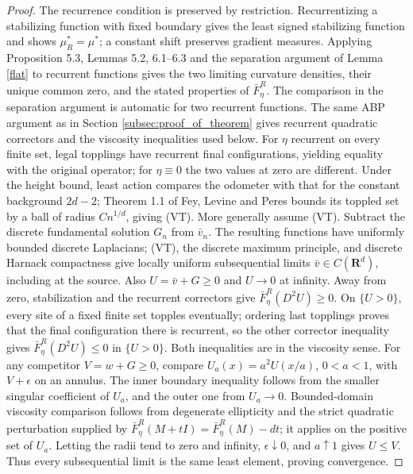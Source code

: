\documentclass[12pt]{amsart}
\newcommand{\R}{\mathbf{R}}
\begin{document}
\begin{proof} %
The recurrence condition is preserved by restriction. Recurrentizing a stabilizing function with fixed boundary gives the least signed stabilizing function and shows $\mu_R^*=\mu^*$; a constant shift preserves gradient measures. Applying Proposition 5.3, Lemmas 5.2, 6.1--6.3 and the separation argument of Lemma \ref{flat} to recurrent functions gives the two limiting curvature densities, their unique common zero, and the stated properties of $\bar F^R_\eta$. The comparison in the separation argument is automatic for two recurrent functions. The same ABP argument as in Section \ref{subsec:proof_of_theorem} gives recurrent quadratic correctors and the viscosity inequalities used below. For $\eta$ recurrent on every finite set, legal topplings have recurrent final configurations, yielding equality with the original operator; for $\eta\equiv0$ the two values at zero are different. %
Under the height bound, least action compares the odometer with that for the constant background $2d-2$; Theorem 1.1 of Fey, Levine and Peres \cite{fey2010growth} bounds its toppled set by a ball of radius $Cn^{1/d}$, giving (VT). More generally assume (VT). Subtract the discrete fundamental solution $G_n$ from $\bar v_n$. The resulting functions have uniformly bounded discrete Laplacians; (VT), the discrete maximum principle, and discrete Harnack compactness give locally uniform subsequential limits $\bar v\in C(\R^d)$, including at the source. Also $U=\bar v+G\geq0$ and $U\to0$ at infinity. %
Away from zero, stabilization and the recurrent correctors give $\bar F^R_\eta(D^2U)\geq0$. On $\{U>0\}$, every site of a fixed finite set topples eventually; ordering last topplings proves that the final configuration there is recurrent, so the other corrector inequality gives $\bar F^R_\eta(D^2U)\leq0$ in $\{U>0\}$. Both inequalities are in the viscosity sense. %
For any competitor $V=w+G\geq0$, compare $U_a(x)=a^2U(x/a)$, $0<a<1$, with $V+\epsilon$ on an annulus. The inner boundary inequality follows from the smaller singular coefficient of $U_a$, and the outer one from $U_a\to0$. Bounded-domain viscosity comparison follows from degenerate ellipticity and the strict quadratic perturbation supplied by $\bar F^R_\eta(M+tI)=\bar F^R_\eta(M)-dt$; it applies on the positive set of $U_a$. Letting the radii tend to zero and infinity, $\epsilon\downarrow0$, and $a\uparrow1$ gives $U\leq V$. Thus every subsequential limit is the same least element, proving convergence. %
\end{proof} %
\end{document}
